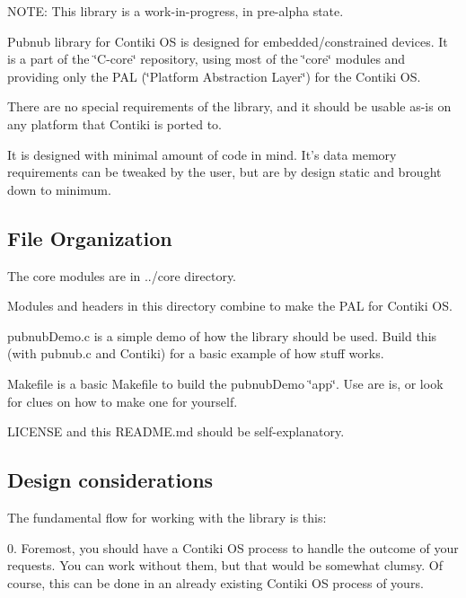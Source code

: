 N\-O\-T\-E\-: This library is a work-\/in-\/progress, in pre-\/alpha state.

Pubnub library for Contiki O\-S is designed for embedded/constrained devices. It is a part of the \char`\"{}\-C-\/core\char`\"{} repository, using most of the \char`\"{}core\char`\"{} modules and providing only the P\-A\-L (\char`\"{}\-Platform Abstraction
\-Layer\char`\"{}) for the Contiki O\-S.

There are no special requirements of the library, and it should be usable as-\/is on any platform that Contiki is ported to.

It is designed with minimal amount of code in mind. It's data memory requirements can be tweaked by the user, but are by design static and brought down to minimum.

\subsection*{File Organization}

The core modules are in {\ttfamily ../core} directory.

Modules and headers in this directory combine to make the P\-A\-L for Contiki O\-S.

{\ttfamily pubnub\-Demo.\-c} is a simple demo of how the library should be used. Build this (with pubnub.\-c and Contiki) for a basic example of how stuff works.

{\ttfamily Makefile} is a basic Makefile to build the pubnub\-Demo \char`\"{}app\char`\"{}. Use are is, or look for clues on how to make one for yourself.

{\ttfamily L\-I\-C\-E\-N\-S\-E} and this {\ttfamily R\-E\-A\-D\-M\-E.\-md} should be self-\/explanatory.

\subsection*{Design considerations}

The fundamental flow for working with the library is this\-:

0. Foremost, you should have a Contiki O\-S process to handle the outcome of your requests. You can work without them, but that would be somewhat clumsy. Of course, this can be done in an already existing Contiki O\-S process of yours.


